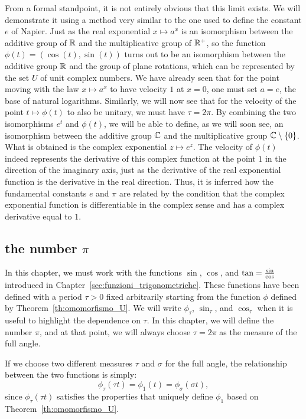 From a formal standpoint, it is not entirely obvious that this limit exists. We
will demonstrate it using a method very similar to the one used to define the
constant $e$ of Napier. Just as the real exponential $x\mapsto a^x$ is an
isomorphism between the additive group of ${\mathbb R}$ and the multiplicative group of
${\mathbb R}^+$, so the function $\phi(t) = (\cos(t), \sin(t))$ turns out to be an
isomorphism between the additive group ${\mathbb R}$ and the group of plane rotations,
which can be represented by the set $U$ of unit complex numbers. We have already
seen that for the point moving with the law $x\mapsto a^x$ to have velocity $1$
at $x=0$, one must set $a=e$, the base of natural logarithms. Similarly, we will
now see that for the velocity of the point $t\mapsto \phi(t)$ to also be
unitary, we must have $\tau = 2\pi$. By combining the two isomorphisms $e^t$ and
$\phi(t)$, we will be able to define, as we will soon see, an isomorphism
between the additive group ${\mathbb C}$ and the multiplicative group
${\mathbb C}\setminus{\left\{ 0 \right\}}$. What is obtained is the complex exponential $z\mapsto
e^z$. The velocity of $\phi(t)$ indeed represents the derivative of this complex
function at the point $1$ in the direction of the imaginary axis, just as the
derivative of the real exponential function is the derivative in the real
direction. Thus, it is inferred how the fundamental constants $e$ and $\pi$ are
related by the condition that the complex exponential function is differentiable
in the complex sense and has a complex derivative equal to $1$.

\subsection{the number $\pi$}

In this chapter, we must work with the functions $\sin$, $\cos$, and
$\operatorname{tan}=\frac{\sin }{\cos}$ introduced in
Chapter~\ref{sec:funzioni_trigonometriche}. These functions have been defined
with a period $\tau>0$ fixed arbitrarily starting from the function $\phi$
defined by Theorem~\ref{th:omomorfismo_U}. We will write $\phi_\tau$,
$\sin_\tau$, and $\cos_\tau$ when it is useful to highlight the dependence on
$\tau$. In this chapter, we will define the number $\pi$, and at that point, we
will always choose $\tau=2\pi$ as the measure of the full angle.

If we choose two different measures $\tau$ and $\sigma$ for the full angle, the
relationship between the two functions is simply:
\begin{equation}\label{cambio_angolo}
  \phi_\tau (\tau t) = \phi_1(t) = \phi_\sigma(\sigma t), 
\end{equation}
since $\phi_\tau(\tau t)$ satisfies the properties that uniquely define $\phi_1$
based on Theorem~\ref{th:omomorfismo_U}.

